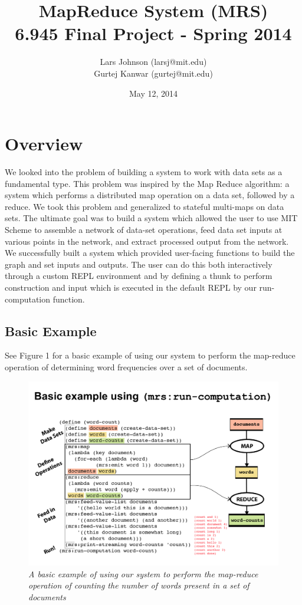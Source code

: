\documentclass{article}
\title{MapReduce System (MRS)\\
{\large 6.945 Final Project - Spring 2014}}
\author{Lars Johnson (larsj@mit.edu) \\ Gurtej Kanwar (gurtej@mit.edu)}
\date{May 12, 2014}
\begin{document}
\pagestyle{myheadings}
\maketitle


\section{Overview}

We looked into the problem of building a system to work with data sets
as a fundamental type. This problem was inspired by the Map Reduce algorithm:
a system which performs a distributed map operation on a data set, followed
by a reduce. We took this problem and generalized to stateful multi-maps on data
sets. The ultimate goal was to build a system which allowed the user to
use MIT Scheme to assemble a network of data-set operations, feed data set
inputs at various points in the network, and extract processed output from
the network. We successfully built a system which provided user-facing functions
to build the graph and set inputs and outputs. The user can do this both interactively
through a custom REPL environment and by defining a thunk to perform construction
and input which is executed in the default REPL by our run-computation function.

\subsection{Basic Example}

See Figure 1 for a basic example of using our system to perform the
map-reduce operation of determining word frequencies over a set of documents.
\begin{figure}[h!]
  \includegraphics[width=\textwidth]{basic-example.png}
  \caption{\emph{\small A basic example of using our system to
      perform the map-reduce operation of counting the number of
      words present in a set of documents}}
\end{figure}
\end{document}
